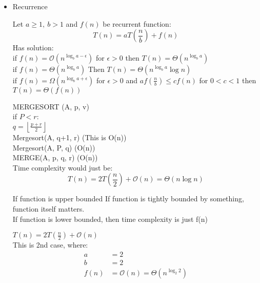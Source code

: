 \begin{itemize}
	\item Recurrence
	\begin{theorem}
		Let $a \ge 1,~ b > 1$ and $f(n)$ be recurrent function:\\
		\begin{equation}
			T(n) = a T\left( \frac{n}{b} \right) + f(n)
		\end{equation}
		Has solution:\\
		if $f(n)=\mathcal{O}\left( n^{\log_b a - \epsilon} \right) $ for $\epsilon > 0$ then $T(n) = \Theta \left( n^{\log_b a} \right) $ \\
		if $f(n) = \Theta\left( n^{\log_b a} \right) $ Then $T(n) = \Theta\left( n^{ \log_b a} \log n \right) $ \\
		if $f(n)=\Omega\left( n^{\log_b a + \epsilon} \right) $ for $\epsilon > 0$ and $af\left( \frac{n}{b} \right)  \le  cf\left( n \right) $ for $0 < c < 1$ then $T(n) = \Theta\left( f\left( n \right)  \right) $\\
	\end{theorem}
	\begin{example}
		MERGESORT (A, p, v)\\
		if $P < r$:\\
		    $q = \left\lfloor \frac{p + r}{2} \right\rfloor$\\
			Mergesort(A, q+1, r) (This is O(n))\\
			Mergesort(A, P, q) (O(n))\\
			MERGE(A, p, q, r) (O(n))\\
		Time complexity would just be:
		\begin{equation}
			T(n) = 2T\left( \frac{n}{2} \right)  + \mathcal O(n) = \Theta\left( n \log n \right) 
		\end{equation}
	\end{example}
	\begin{example}
		If function is upper bounded
		If function is tightly bounded by something, function itself matters.\\
		If function is lower bounded, then time complexity is just f(n)
	\end{example}
	\begin{example}
		$T\left( n \right) = 2T\left( \frac{n}{2} \right) + \mathcal O(n)$ \\
		This is 2nd case, where:
		\begin{align*}
			a &=  2 \\
			b &= 2 \\
			f\left( n \right) &= \mathcal O \left( n \right) = \Theta\left( n^{\log_2 2} \right)  \\

\end{align*}
\end{example}
\end{itemize}
